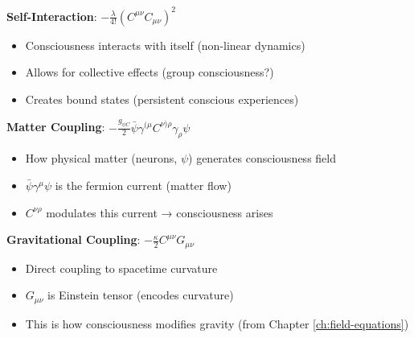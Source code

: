 \begin{level2}
\textbf{Self-Interaction}: $-\frac{\lambda}{4!}(C^{\mu\nu}C_{\mu\nu})^2$
\begin{itemize}
\item Consciousness interacts with itself (non-linear dynamics)
\item Allows for collective effects (group consciousness?)
\item Creates bound states (persistent conscious experiences)
\end{itemize}

\textbf{Matter Coupling}: $-\frac{g_{\psi C}}{2}\bar{\psi}\gamma^{(\mu}C^{\nu)\rho}\gamma_\rho\psi$
\begin{itemize}
\item How physical matter (neurons, $\psi$) generates consciousness field
\item $\bar{\psi}\gamma^\mu\psi$ is the fermion current (matter flow)
\item $C^{\nu\rho}$ modulates this current → consciousness arises
\end{itemize}

\textbf{Gravitational Coupling}: $-\frac{\kappa}{2}C^{\mu\nu}G_{\mu\nu}$
\begin{itemize}
\item Direct coupling to spacetime curvature
\item $G_{\mu\nu}$ is Einstein tensor (encodes curvature)
\item This is how consciousness modifies gravity (from Chapter \ref{ch:field-equations})
\end{itemize}
\end{level2}

